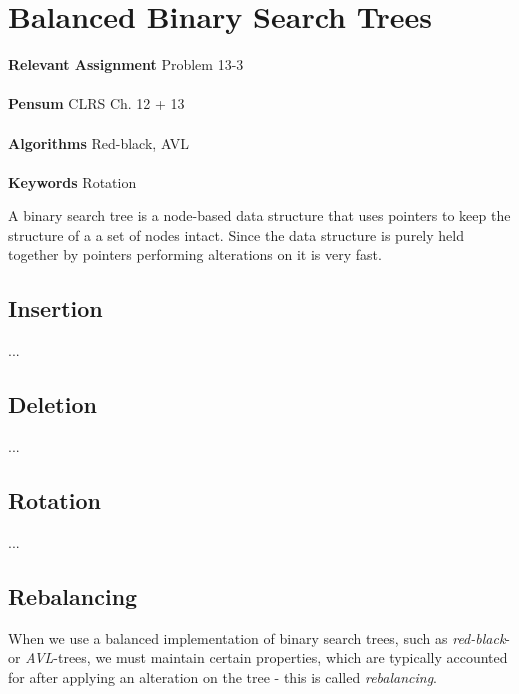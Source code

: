 
\chapter{Balanced Binary Search Trees}
\label{ch:balancedbinarysearchtrees}

\textbf{Relevant Assignment} Problem 13-3\\\\
\textbf{Pensum} CLRS Ch. 12 + 13\\\\
\textbf{Algorithms} Red-black, AVL\\\\
\textbf{Keywords} Rotation
\vspace{1in}

\noindent A binary search tree is a node-based data structure that uses
pointers to keep the structure of a a set of nodes intact. Since the data
structure is purely held together by pointers performing alterations on it
is very fast.

\newpage
\section{Insertion}
...


\section{Deletion}
...


\section{Rotation}
...


\section{Rebalancing}
When we use a balanced implementation of binary search trees, such as
\textit{red-black}- or \textit{AVL}-trees, we must maintain certain
properties, which are typically accounted for after applying an alteration on
the tree - this is called \textit{rebalancing}.

